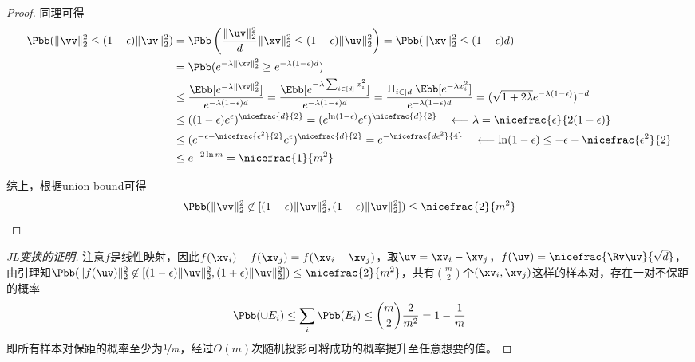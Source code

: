 \documentclass{ctexart}
\begin{document}
\begin{proof}
    同理可得
    \begin{align*}
        \Pbb ( \| \vv \|_2^2 \le (1 - \epsilon) \|\uv\|_2^2)
         & = \Pbb \left( \frac{\|\uv\|_2^2}{d} \| \xv \|_2^2 \le (1 - \epsilon) \|\uv\|_2^2 \right) = \Pbb (\| \xv \|_2^2 \le (1 - \epsilon) d)                                                                                                                                                             \\
         & = \Pbb (e^{-\lambda \|\xv \|_2^2} \ge e^{-\lambda (1 - \epsilon) d})                                                                                                                                                                                                                               \\
         & \le \frac{\Ebb [e^{-\lambda \|\xv \|_2^2}]}{e^{-\lambda (1 - \epsilon) d}} = \frac{\Ebb[e^{- \lambda \sum_{i \in [d]} x_i^2}]}{e^{-\lambda (1 - \epsilon) d}} = \frac{\Pi_{i \in [d]} \Ebb[e^{-\lambda x_i^2}]}{e^{-\lambda (1 - \epsilon) d}} = (\sqrt{1 + 2 \lambda} e^{- \lambda (1 - \epsilon)})^{-d} \\
         & \le ( (1 - \epsilon) e^{\epsilon} )^{\nicefrac{d}{2}} = ( e^{\ln (1 - \epsilon)} e^{\epsilon} )^{\nicefrac{d}{2}} \quad \longleftarrow \lambda = \nicefrac{\epsilon}{2 (1 - \epsilon)} \\
         & \le ( e^{- \epsilon - \nicefrac{\epsilon^2}{2}} e^{\epsilon} )^{\nicefrac{d}{2}} =  e^{-\nicefrac{d \epsilon^2}{4}} \quad \longleftarrow \ln (1 - \epsilon) \le - \epsilon - \nicefrac{\epsilon^2}{2} \\
         & \le e^{-2 \ln m} = \nicefrac{1}{m^2}
    \end{align*}

    综上，根据union bound可得
    \begin{align*}
        \Pbb ( \| \vv \|_2^2 \not \in [(1 - \epsilon) \|\uv\|_2^2, (1 + \epsilon) \|\uv\|_2^2]) \le \nicefrac{2}{m^2}
    \end{align*}
\end{proof}

\begin{proof} [JL变换的证明]
    注意$f$是线性映射，因此$f(\xv_i) - f(\xv_j) = f(\xv_i - \xv_j)$，取$\uv = \xv_i - \xv_j$，$f(\uv) = \nicefrac{\Rv \uv}{\sqrt{d}}$，由引理知$\Pbb ( \| f(\uv) \|_2^2 \not \in [(1 - \epsilon) \|\uv\|_2^2, (1 + \epsilon) \|\uv\|_2^2]) \le \nicefrac{2}{m^2}$，共有$\binom{m}{2}$个$(\xv_i, \xv_j)$这样的样本对，存在一对不保距的概率
    \begin{align*}
        \Pbb (\cup E_i) \le \sum_i \Pbb (E_i) \le \binom{m}{2} \frac{2}{m^2} = 1 - \frac{1}{m}
    \end{align*}
    即所有样本对保距的概率至少为$\nicefrac{1}{m}$，经过$O(m)$次随机投影可将成功的概率提升至任意想要的值。
\end{proof}
\end{document}
